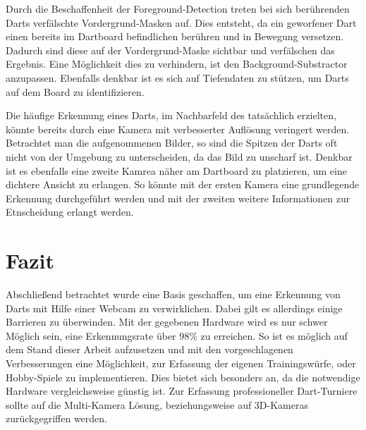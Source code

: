 Durch die Beschaffenheit der Foreground-Detection treten bei sich berührenden Darts verfälschte Vordergrund-Masken auf. Dies entsteht, da ein geworfener Dart einen bereits im Dartboard befindlichen berühren und in Bewegung versetzen. Dadurch sind diese auf der Vordergrund-Maske sichtbar und verfälschen das Ergebnis.
Eine Möglichkeit dies zu verhindern, ist den Background-Substractor anzupassen. Ebenfalls denkbar ist es sich auf Tiefendaten zu stützen, um Darts auf dem Board zu identifizieren. 


Die häufige Erkennung eines Darts, im Nachbarfeld des tatsächlich erzielten, könnte bereits durch eine Kamera mit verbesserter Auflösung veringert werden. Betrachtet man die aufgenommenen Bilder, so sind die Spitzen der Darts oft nicht von der Umgebung zu unterscheiden, da das Bild zu unscharf ist. Denkbar ist es ebenfalls eine zweite Kamrea näher am Dartboard zu platzieren, um eine dichtere Ansicht zu erlangen. So könnte mit der ersten Kamera eine grundlegende Erkennung durchgeführt werden und mit der zweiten weitere Informationen zur Etnscheidung erlangt werden. 

\section*{Fazit}
Abschließend betrachtet wurde eine Basis geschaffen, um eine Erkennung von Darts mit Hilfe einer Webcam zu verwirklichen. Dabei gilt es allerdings einige Barrieren zu überwinden. Mit der gegebenen Hardware wird es nur schwer Möglich sein, eine Erkennungsrate über $98\%$ zu erreichen. So ist es möglich auf dem Stand dieser Arbeit aufzusetzen und mit den vorgeschlagenen Verbesserungen eine Möglichkeit, zur Erfassung der eigenen Trainingswürfe, oder Hobby-Spiele zu implementieren. Dies bietet sich besonders an, da die notwendige Hardware vergleichsweise günstig ist. Zur Erfassung professioneller Dart-Turniere sollte auf die Multi-Kamera Lösung, beziehungsweise auf 3D-Kameras zurückgegriffen werden.





